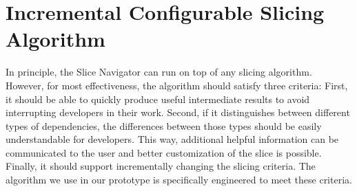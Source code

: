 \section{Incremental Configurable Slicing Algorithm}

\tmpStart
In principle, the Slice Navigator can run on top of any slicing algorithm.
However, for most effectiveness, the algorithm should satisfy three criteria:
First, it should be able to quickly produce useful intermediate results to avoid interrupting developers in their work.
Second, if it distinguishes between different types of dependencies, the differences between those types should be easily understandable for developers.
This way, additional helpful information can be communicated to the user and better customization of the slice is possible.
Finally, it should support incrementally changing the slicing criteria.
The algorithm we use in our prototype is specifically engineered to meet these criteria.

%
%
%
%


